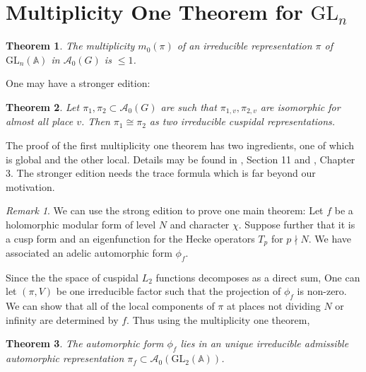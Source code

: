 \documentclass[11pt,english]{smfart}
\newtheorem{theorem}{Theorem}
\theoremstyle{definition}
\theoremstyle{remark}
\newtheorem*{remark}{Remark}
\begin{document}
\section{Multiplicity One Theorem for $\mathrm{GL}_n$}
\begin{theorem}
The multiplicity $m_0(\pi)$ of an irreducible representation $\pi$ of $\mathrm{GL}_n(\mathbb{A})$ in $\mathcal{A}_0(G)$ is $\leq 1$.
\end{theorem}
One may have a stronger edition:
\begin{theorem}
Let $\pi_1,\pi_2 \subset \mathcal{A}_0(G)$ are such that $\pi_{1,v},\pi_{2,v}$ are isomorphic for almost all place $v$. Then $\pi_1 \cong \pi_2$ as two irreducible cuspidal representations.
\end{theorem}
The proof of the first multiplicity one theorem has
two ingredients, one of which is global and the
other local. Details may be found in \cite{JL70}, Section 11 and \cite{Bum97}, Chapter 3.
The stronger edition needs the trace formula which is far beyond our motivation.
\begin{remark}
    We can use the strong edition to prove one main theorem:
    Let $ f $ be a holomorphic modular form of level $ N $ and character $ \chi $.
    Suppose further that it is a cusp form and an eigenfunction for the Hecke operators $ T_{p} $ for $  p \nmid N $.
    We have associated an adelic automorphic form $ \phi_{f}  $.
    
    Since the the space of cuspidal $L_2$ functions decomposes as a direct sum,
One can let $ (\pi, V) $ be one irreducible factor such that the projection of $ \phi_{f} $ is non-zero.
We can show that all of the local components of $ \pi $ at places not dividing $N $ or infinity are determined by $ f $. Thus using the multiplicity one theorem,
    \begin{theorem}
    The automorphic form $ \phi_{f} $ lies in an unique irreducible admissible automorphic representation $ \pi_{f} \subset \mathcal{A}_{0}(\mathrm{GL}_{2}(\mathbb{A}))$.
    \end{theorem}
\end{remark}
\end{document}
